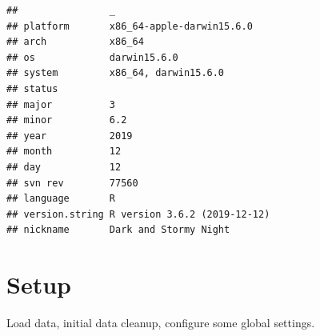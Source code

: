 \documentclass[
]{book}
\begin{document}
\begin{verbatim}
##                _                           
## platform       x86_64-apple-darwin15.6.0   
## arch           x86_64                      
## os             darwin15.6.0                
## system         x86_64, darwin15.6.0        
## status                                     
## major          3                           
## minor          6.2                         
## year           2019                        
## month          12                          
## day            12                          
## svn rev        77560                       
## language       R                           
## version.string R version 3.6.2 (2019-12-12)
## nickname       Dark and Stormy Night
\end{verbatim}

\hypertarget{setup}{%
\section{Setup}\label{setup}}

Load data, initial data cleanup, configure some global settings.
\end{document}
